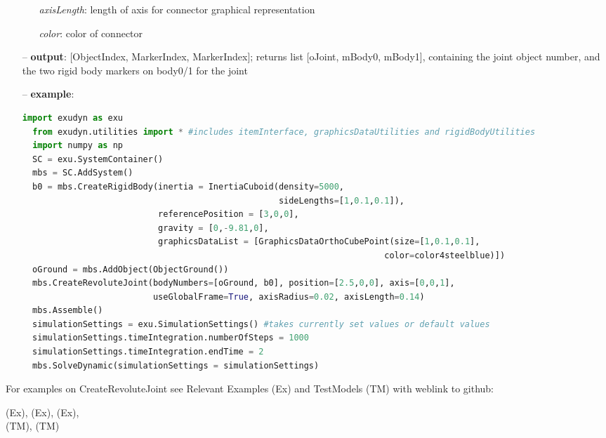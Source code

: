 \begin{itemize}[leftmargin=0.7cm]
\begin{itemize}[leftmargin=1.2cm]
\item[]{\it axisLength}: length of axis for connector graphical representation
\item[]{\it color}: color of connector
\end{itemize}
\item[--]
{\bf output}: [ObjectIndex, MarkerIndex, MarkerIndex]; returns list [oJoint, mBody0, mBody1], containing the joint object number, and the two rigid body markers on body0/1 for the joint
\item[--]
{\bf example}: \vspace{-12pt}\ei\begin{lstlisting}[language=Python, xleftmargin=36pt]
  import exudyn as exu
  from exudyn.utilities import * #includes itemInterface, graphicsDataUtilities and rigidBodyUtilities
  import numpy as np
  SC = exu.SystemContainer()
  mbs = SC.AddSystem()
  b0 = mbs.CreateRigidBody(inertia = InertiaCuboid(density=5000,
                                                   sideLengths=[1,0.1,0.1]),
                           referencePosition = [3,0,0],
                           gravity = [0,-9.81,0],
                           graphicsDataList = [GraphicsDataOrthoCubePoint(size=[1,0.1,0.1],
                                                                        color=color4steelblue)])
  oGround = mbs.AddObject(ObjectGround())
  mbs.CreateRevoluteJoint(bodyNumbers=[oGround, b0], position=[2.5,0,0], axis=[0,0,1],
                          useGlobalFrame=True, axisRadius=0.02, axisLength=0.14)
  mbs.Assemble()
  simulationSettings = exu.SimulationSettings() #takes currently set values or default values
  simulationSettings.timeIntegration.numberOfSteps = 1000
  simulationSettings.timeIntegration.endTime = 2
  mbs.SolveDynamic(simulationSettings = simulationSettings)
\end{lstlisting}\vspace{-24pt}\bi\item[]\vspace{-24pt}\vspace{12pt}\end{itemize}
%

%
\noindent For examples on CreateRevoluteJoint see Relevant Examples (Ex) and TestModels (TM) with weblink to github:
\bi
 \item \footnotesize {} (Ex), 
 (Ex), 
 (Ex), 
\\  (TM), 
 (TM)
\ei


